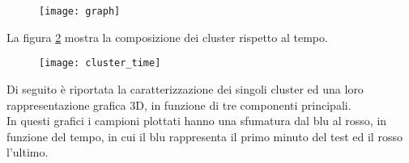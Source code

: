 \begin{figure}[!htbp]
  \centering
  \texttt{[image: graph]}
  \caption{}
  \label{webserver_graph}
\end{figure}
La figura \ref{webserver_cluster_time} mostra la composizione dei cluster rispetto al tempo.\\
\begin{figure}[!htbp]
  \centering
  \texttt{[image: cluster\_time]}
  \caption{}
  \label{webserver_cluster_time}
\end{figure}

\clearpage

Di seguito è riportata la caratterizzazione dei singoli cluster ed una loro
rappresentazione grafica 3D, in funzione di tre componenti principali.\\
In questi grafici i campioni plottati hanno una sfumatura dal blu al rosso, in
funzione del tempo, in cui il blu rappresenta il primo minuto del test ed il
rosso l'ultimo.\\

